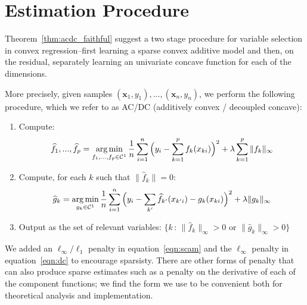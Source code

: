 \section{Estimation Procedure}
\label{sec:acdc}

Theorem~\ref{thm:acdc_faithful} suggest a two stage procedure for variable selection in convex regression--first learning a sparse convex additive model and then, on the residual, separately learning an univariate concave function for each of the dimensions. 

More precisely, given samples $(\mathbf{x}_1, y_1), ..., (\mathbf{x}_n, y_n)$, we perform the following procedure, which we refer to as AC/DC (additively convex / decoupled concave):
\begin{enumerate}
\item Compute: 
\begin{equation}
\label{eqn:scam}
\widehat{f}_1, ..., \widehat{f}_p = \mathop{\text{\rm arg\,min}}_{f_1,...,f_p \in \mathcal{C}^1} 
   \frac{1}{n} \sum_{i=1}^n \Big(y_i - \sum_{k=1}^p f_k(x_{ki}) \Big)^2 
       + \lambda \sum_{k=1}^p \| f_k \|_\infty
\end{equation}
\item Compute, for each $k$ such that $\| \hat{f}_k \| = 0$:
\begin{equation}
\label{eqn:dc}
\widehat{g}_k = \mathop{\text{\rm arg\,min}}_{g_k \in \mathcal{C}^1} 
   \frac{1}{n} \sum_{i=1}^n \Big( y_i - \sum_{k'} \widehat{f}_{k'}(x_{k'i}) 
    - g_k(x_{ki})\Big)^2 
      + \lambda \| g_k \|_\infty
\end{equation}
\item Output as the set of relevant variables: 
$\{ k \,:\, \| \hat{f}_k \|_\infty > 0 
  \textrm{ or } \| \hat{g}_k \|_\infty > 0 \}$ 
\end{enumerate}

We added an $\ell_\infty/\ell_1$ penalty in equation~\ref{eqn:scam} and the $\ell_\infty$ penalty in equation~\ref{eqn:dc} to encourage sparsisty. There are other forms of penalty that can also produce sparse estimates such as a penalty on the derivative of each of the component functions; we find the form we use to be convenient both for theoretical analysis and implementation.

 
